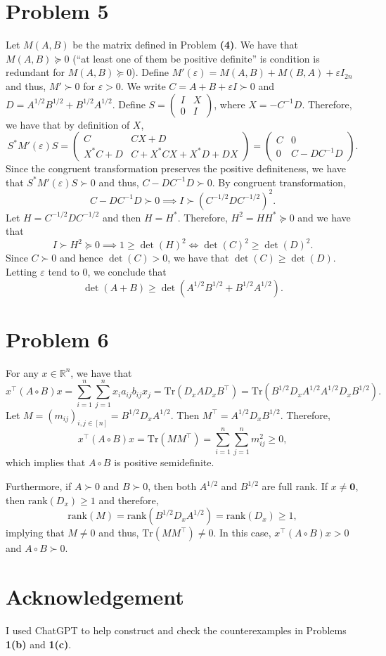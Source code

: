 \documentclass[11pt]{article}
\theoremstyle{plain}
\theoremstyle{definition}
\theoremstyle{remark}
\newcommand{\eps}{\varepsilon}
\newcommand{\R}{\mathbb{R}}
\newcommand{\tuple}[1]{\left(#1\right)}
\newcommand{\tp}{\tuple}
\newcommand{\Tr}{\-{Tr}}
\newcommand{\rank}{\-{rank}}
\def\*#1{\boldsymbol{#1}} %
\def\-#1{\mathrm{#1}} %
\begin{document}
\section*{Problem 5}
Let $M(A,B)$ be the matrix defined in Problem \textbf{(4)}.
We have that $M(A,B)\succeq 0$ (``at least one of them be positive definite'' is condition is redundant for $M(A,B)\succeq 0$).
Define $M'(\eps) = M(A,B) + M(B,A) + \eps I_{2n}$ and thus, $M' \succ 0$ for $\eps > 0$.
We write $C = A+B+\eps I\succ 0$ and $D = A^{1/2}B^{1/2}+B^{1/2}A^{1/2}$.
Define $S = \begin{pmatrix}
    I & X
    \\0 & I
\end{pmatrix}$, where $X = - C^{-1}D$.
Therefore, we have that by definition of $X$,
$$
    S^* M'(\eps) S = \begin{pmatrix}
    C & CX+D
    \\X^*C+D & C+X^*CX+X^*D+DX
\end{pmatrix}=\begin{pmatrix}
    C & 0
    \\0 & C-DC^{-1}D
\end{pmatrix}.
$$
Since the congruent transformation preserves the positive definiteness, we have that $S^* M'(\eps) S \succ 0$ and thus, $C-DC^{-1}D\succ 0$.
By congruent transformation, 
$$
    C-DC^{-1}D\succ 0 \implies I\succ \tp{C^{-1/2}DC^{-1/2}}^2 .
$$
Let $H = C^{-1/2}DC^{-1/2}$ and then $H = H^*$.
Therefore, $H^2 = HH^* \succeq 0$ and we have that
$$
    I \succ H^2 \succeq 0 \implies 1 \geq \det(H)^2
    \iff \det(C)^2 \geq \det(D)^2.
$$
Since $C\succ 0$ and hence $\det(C)>0$, we have that $\det(C)\geq \det(D)$.
Letting $\eps$ tend to $0$, we conclude that
$$
    \det(A+B) \geq \det\tp{A^{1/2}B^{1/2}+B^{1/2}A^{1/2}} .
$$
\section*{Problem 6}
For any $x\in \R^n$, we have that 
$$
    x^\top (A\circ B)x = \sum_{i=1}^n \sum_{j=1}^n x_i a_{ij}b_{ij}x_j
    = \Tr\tp{D_x A D_x B^\top}
    = \Tr\tp{B^{1/2}D_x A^{1/2}A^{1/2}D_xB^{1/2}} .
$$
Let $ M = (m_{ij})_{i,j\in[n]} = B^{1/2}D_x A^{1/2}$. Then $M^\top = A^{1/2}D_xB^{1/2}$.
Therefore,
$$
    x^\top (A\circ B)x = \Tr\tp{MM^\top} = \sum_{i=1}^n \sum_{j=1}^n m_{ij}^2 \geq 0,
$$
which implies that $A\circ B$ is positive semidefinite.

Furthermore, if $A\succ 0$ and $B\succ 0$, then both $A^{1/2}$ and $B^{1/2}$ are full rank.
If $x\neq \*0$, then $\-{rank}(D_x) \geq 1$ and therefore,
$$
    \rank(M) = \rank(B^{1/2}D_xA^{1/2}) = \rank(D_x) \geq 1,
$$
implying that $M\neq 0$ and thus, $\Tr\tp{MM^\top}\neq 0$.
In this case, $x^\top (A\circ B)x > 0$ and $A\circ B\succ 0$.
\section*{Acknowledgement}
I used ChatGPT to help construct and check the counterexamples in Problems \textbf{1(b)} and \textbf{1(c)}.
\end{document}
